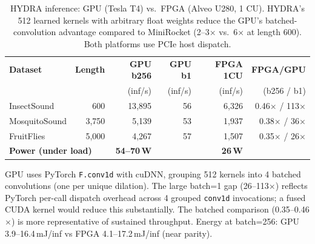 
\begin{table}[t]
\centering
\caption{HYDRA inference: GPU (Tesla T4) vs.\ FPGA (Alveo U280, 1 CU).
HYDRA's 512 learned kernels with arbitrary float weights reduce the GPU's
batched-convolution advantage compared to MiniRocket (2--3$\times$ vs.\
6$\times$ at length 600). Both platforms use PCIe host dispatch.}
\label{tab:hydra_gpu}
\begin{tabular}{l r r r r r}
\toprule
\textbf{Dataset} & \textbf{Length} & \textbf{GPU b256} & \textbf{GPU b1} & \textbf{FPGA 1CU} & \textbf{FPGA/GPU} \\
 & & (inf/s) & (inf/s) & (inf/s) & (b256 / b1) \\
\midrule
InsectSound   & 600   & 13{,}895 & 56  & 6{,}326 & 0.46$\times$ / 113$\times$ \\
MosquitoSound & 3{,}750 & 5{,}139  & 53  & 1{,}937 & 0.38$\times$ / 36$\times$ \\
FruitFlies    & 5{,}000 & 4{,}267  & 57  & 1{,}507 & 0.35$\times$ / 26$\times$ \\
\midrule
\multicolumn{2}{l}{\textbf{Power (under load)}} & \textbf{54--70\,W} & & \textbf{26\,W} & \\
\bottomrule
\end{tabular}

\vspace{0.3em}
\footnotesize
GPU uses PyTorch \texttt{F.conv1d} with cuDNN, grouping 512 kernels into
4 batched convolutions (one per unique dilation). The large batch=1 gap
(26--113$\times$) reflects PyTorch per-call dispatch overhead across 4
grouped \texttt{conv1d} invocations; a fused CUDA kernel would reduce
this substantially. The batched comparison (0.35--0.46$\times$) is more
representative of sustained throughput. Energy at batch=256:
GPU 3.9--16.4\,mJ/inf vs FPGA 4.1--17.2\,mJ/inf (near parity).
\end{table}
